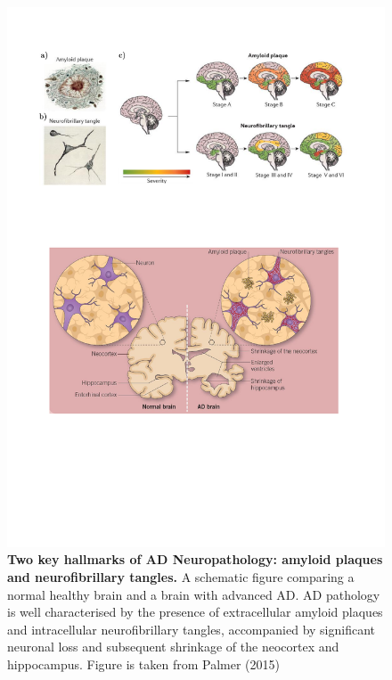 \vspace{0.5cm}
\begin{figure}[!ht]
	\centering
	\includegraphics[page=1,trim={0 7cm 1cm 13cm},clip, scale = 0.75]{Figures/Introduction_Figures.pdf}
	\captionsetup{width=0.95\textwidth,singlelinecheck=off}
	\caption[Two key hallmarks of AD Neuropathology: amyloid plaques and neurofibrillary tangles]%
	{\textbf{Two key hallmarks of AD Neuropathology: amyloid plaques and neurofibrillary tangles.} A schematic figure comparing a normal healthy brain and a brain with advanced AD. AD pathology is well characterised by the presence of extracellular amyloid plaques and intracellular neurofibrillary tangles, accompanied by significant neuronal loss and subsequent shrinkage of the neocortex and hippocampus. Figure is taken from Palmer (2015)\cite{AlanM.Palmer2015}
	}
	\label{fig:AD_intro}
\end{figure} 

